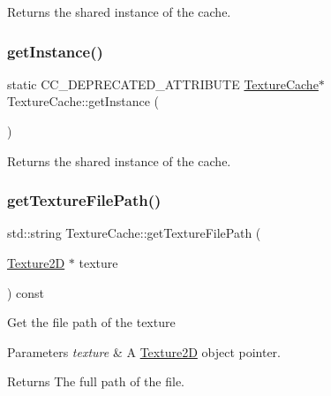 Returns the shared instance of the cache. \mbox{\label{classTextureCache_aa3b70b207c1fe514b6806695dbc43564}} 
\subsubsection{\texorpdfstring{get\+Instance()}{getInstance()}\hspace{0.1cm}{\footnotesize\ttfamily [2/2]}}
{\footnotesize\ttfamily static C\+C\+\_\+\+D\+E\+P\+R\+E\+C\+A\+T\+E\+D\+\_\+\+A\+T\+T\+R\+I\+B\+U\+TE \hyperlink{classTextureCache}{Texture\+Cache}$\ast$ Texture\+Cache\+::get\+Instance (\begin{DoxyParamCaption}{ }\end{DoxyParamCaption})\hspace{0.3cm}{\ttfamily [static]}}

Returns the shared instance of the cache. \mbox{\label{classTextureCache_a4dd4a314af856fd66bb10b53a61fd0ea}} 
\subsubsection{\texorpdfstring{get\+Texture\+File\+Path()}{getTextureFilePath()}\hspace{0.1cm}{\footnotesize\ttfamily [1/2]}}
{\footnotesize\ttfamily std\+::string Texture\+Cache\+::get\+Texture\+File\+Path (\begin{DoxyParamCaption}\item[{\hyperlink{classTexture2D}{Texture2D} $\ast$}]{texture }\end{DoxyParamCaption}) const}

Get the file path of the texture


\begin{DoxyParams}{Parameters}
{\em texture} & A \hyperlink{classTexture2D}{Texture2D} object pointer.\\
\hline
\end{DoxyParams}
\begin{DoxyReturn}{Returns}
The full path of the file. 
\end{DoxyReturn}
\mbox{\label{classTextureCache_a4dd4a314af856fd66bb10b53a61fd0ea}} 
